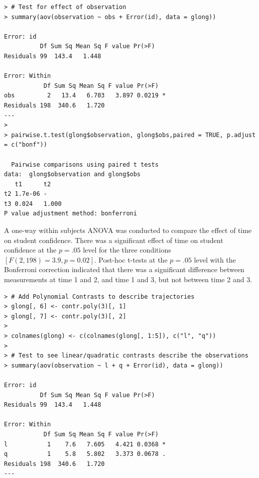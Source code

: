 \documentclass[onecolumn,10pt]{jhwhw}
\begin{document}


\begin{lstlisting}
> # Test for effect of observation
> summary(aov(observation ~ obs + Error(id), data = glong))

Error: id
          Df Sum Sq Mean Sq F value Pr(>F)
Residuals 99  143.4   1.448

Error: Within
           Df Sum Sq Mean Sq F value Pr(>F)
obs         2   13.4   6.703   3.897 0.0219 *
Residuals 198  340.6   1.720
---
>
> pairwise.t.test(glong$observation, glong$obs,paired = TRUE, p.adjust = c("bonf"))

  Pairwise comparisons using paired t tests
data:  glong$observation and glong$obs
   t1      t2
t2 1.7e-06 -
t3 0.024   1.000
P value adjustment method: bonferroni
\end{lstlisting}

A one-way within subjects ANOVA was conducted to compare the effect of time on student confidence. There was a significant effect of time on student confidence at the $p=.05$ level for the three conditions $[F(2, 198) = 3.9, p = 0.02]$. Post-hoc t-tests at the $p=.05$ level with the Bonferroni correction indicated that there was a significant difference between measurements at time 1 and 2, and time 1 and 3, but not between time 2 and 3.\\

\begin{lstlisting}
> # Add Polynomial Contrasts to describe trajectories
> glong[, 6] <- contr.poly(3)[, 1]
> glong[, 7] <- contr.poly(3)[, 2]
>
> colnames(glong) <- c(colnames(glong[, 1:5]), c("l", "q"))
>
> # Test to see linear/quadratic contrasts describe the observations
> summary(aov(observation ~ l + q + Error(id), data = glong))

Error: id
          Df Sum Sq Mean Sq F value Pr(>F)
Residuals 99  143.4   1.448

Error: Within
           Df Sum Sq Mean Sq F value Pr(>F)
l           1    7.6   7.605   4.421 0.0368 *
q           1    5.8   5.802   3.373 0.0678 .
Residuals 198  340.6   1.720
---
\end{lstlisting}
\end{document}
